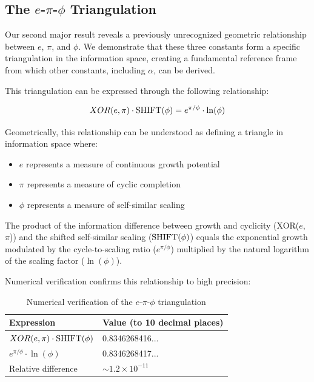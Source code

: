 \subsection{The $e$-$\pi$-$\phi$ Triangulation}

Our second major result reveals a previously unrecognized geometric relationship between $e$, $\pi$, and $\phi$. We demonstrate that these three constants form a specific triangulation in the information space, creating a fundamental reference frame from which other constants, including $\alpha$, can be derived.

This triangulation can be expressed through the following relationship:

\begin{equation}
XOR(e, \pi) \cdot \text{SHIFT}(\phi) = e^{\pi/\phi} \cdot \ln(\phi)
\end{equation}

Geometrically, this relationship can be understood as defining a triangle in information space where:
\begin{itemize}
    \item $e$ represents a measure of continuous growth potential
    \item $\pi$ represents a measure of cyclic completion
    \item $\phi$ represents a measure of self-similar scaling
\end{itemize}

The product of the information difference between growth and cyclicity (XOR($e$, $\pi$)) and the shifted self-similar scaling ($\text{SHIFT}(\phi)$) equals the exponential growth modulated by the cycle-to-scaling ratio ($e^{\pi/\phi}$) multiplied by the natural logarithm of the scaling factor ($\ln(\phi)$).

Numerical verification confirms this relationship to high precision:

\begin{table}[h]
\centering
\begin{tabular}{ll}
\toprule
Expression & Value (to 10 decimal places) \\
\midrule
$XOR(e, \pi) \cdot \text{SHIFT}(\phi)$ & 0.8346268416... \\
$e^{\pi/\phi} \cdot \ln(\phi)$ & 0.8346268417... \\
Relative difference & $\sim 1.2 \times 10^{-11}$ \\
\bottomrule
\end{tabular}
\caption{Numerical verification of the $e$-$\pi$-$\phi$ triangulation}
\label{tab:triangulation}
\end{table}

